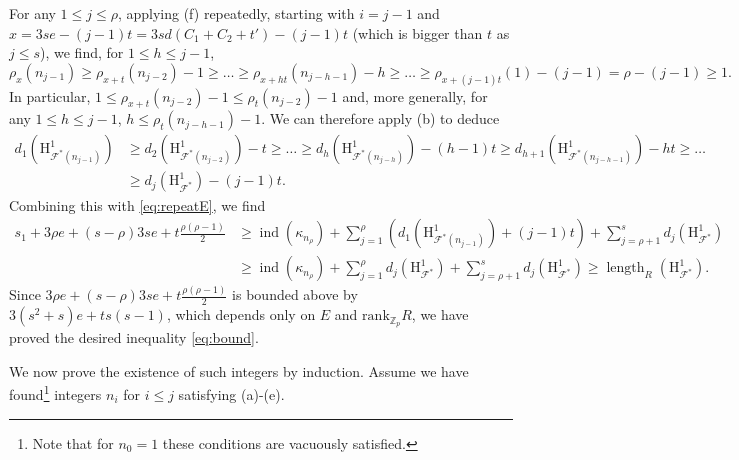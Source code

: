 \documentclass[10pt,reqno]{amsart}
\numberwithin{equation}{section}
\theoremstyle{plain}
\theoremstyle{definition}
\theoremstyle{definition}
\theoremstyle{plain}
\theoremstyle{plain}
\theoremstyle{plain}
\theoremstyle{plain}
\theoremstyle{plain}
\theoremstyle{plain}
\newcommand{\ind}{\operatorname{ind}}
\newcommand{\Zp}{\mathbb{Z}_{p}}
\DeclareMathOperator{\length}{length}
\newcommand{\Fcal}{\mathcal{F}}
\newcommand{\rank}{\mathrm{rank}}
\newcommand{\rH}{\mathrm{H}}
\begin{document}
For any $1\leq j\leq \rho$, applying (f) repeatedly, starting with $i=j-1$ and $x=3se-(j-1)t=3sd(C_1+C_2+t')-(j-1)t$ (which is bigger than $t$ as $j\leq s$), we find, for $1\leq h\leq j-1$,
\[
\rho_x(n_{j-1})\geq \rho_{x+t}(n_{j-2})-1\geq \dots \geq \rho_{x+ht}(n_{j-h-1})-h\geq \dots \geq \rho_{x+(j-1)t}(1)-(j-1)=\rho-(j-1)\geq 1.
\]
In particular, $1\leq \rho_{x+t}(n_{j-2})-1\leq \rho_{t}(n_{j-2})-1$ and, more generally, for any $1\leq h\leq j-1$, $h\leq \rho_{t}(n_{j-h-1})-1$. We can therefore apply (b) to deduce
\begin{align*}
d_1(\rH^1_{\Fcal^*(n_{j-1})}) &\geq d_2(\rH^1_{\Fcal^*(n_{j-2})}) -t \geq \dots\geq d_{h}(\rH^1_{\Fcal^*(n_{j-h})}) -(h-1)t \geq d_{h+1}(\rH^1_{\Fcal^*(n_{j-h-1})}) -ht \geq \dots \\&\geq d_j(\rH^1_{\Fcal^*})-(j-1)t.
\end{align*}
Combining this with \eqref{eq:repeatE}, we find
\begin{align*}
s_1 + 3\rho e + (s-\rho)3se +t \tfrac{\rho(\rho-1)}{2} &\geq \ind(\kappa_{n_\rho})+\sum_{j=1}^{\rho}(d_{1}(\rH^1_{\Fcal^*(n_{j-1})})+(j-1)t) + \sum_{j=\rho+1}^{s} d_{j}(\rH^1_{\Fcal^*})
\\&\geq \ind(\kappa_{n_\rho})+\sum_{j=1}^{\rho}d_{j}(\rH^1_{\Fcal^*}) + \sum_{j=\rho+1}^{s} d_{j}(\rH^1_{\Fcal^*})  \geq \length_R(\rH^1_{\Fcal^*}).
\end{align*}
Since $3\rho e + (s-\rho)3se +t \tfrac{\rho(\rho-1)}{2}$ is bounded above by $3(s^2+s)e+ts(s-1)$, which depends only on $E$ and $\rank_{\Zp}R$, we have proved the desired inequality \eqref{eq:bound}.

We now prove the existence of such integers by induction. Assume we have found\footnote{Note that for $n_0=1$ these conditions are vacuously satisfied.} integers $n_i$ for $i\leq j$ satisfying (a)-(e).
\end{document}
